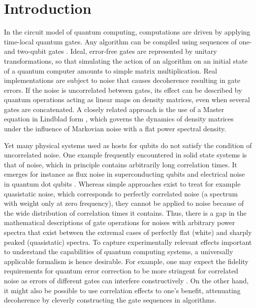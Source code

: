 \section{Introduction}\label{sec:introduction}
In the circuit model of quantum computing, computations are driven by applying time-local quantum gates. Any algorithm can be compiled using sequences of one- and two-qubit gates \cite{DiVincenzo1995}. Ideal, error-free gates are represented by unitary transformations, so that simulating the action of an algorithm on an initial state of a quantum computer amounts to simple matrix multiplication. Real implementations are subject to noise that causes decoherence resulting in gate errors. If the noise is uncorrelated between gates, its effect can be described by quantum operations acting as linear maps on density matrices, even when several gates are concatenated.
A closely related approach is the use of a Master equation in Lindblad form \cite{Lindblad1976}, which governs the dynamics of density matrices under the influence of Markovian noise with a flat power spectral density.

Yet many physical systems used as hosts for qubits do not satisfy the condition of uncorrelated noise. One example frequently encountered in solid state systems is that of \oneoverf noise, which in principle contains arbitrarily long correlation times. It emerges for instance as flux noise in superconducting qubits and electrical noise in quantum dot qubits \cite{Brownnutt2015,Kumar2016,Yoneda2018,Paladino2014}. Whereas simple approaches exist to treat for example quasistatic noise, which corresponds to perfectly correlated noise (\ie a spectrum with weight only at zero frequency), they cannot be applied to \oneoverf noise because of the wide distribution of correlation times it contains. Thus, there is a gap in the mathematical descriptions of gate operations for noises with arbitrary power spectra that exist between the extremal cases of perfectly flat (white) and sharply peaked (quasistatic) spectra. To capture experimentally relevant effects important to understand the capabilities of quantum computing systems, a universally applicable formalism is hence desirable. For example, one may expect the fidelity requirements for quantum error correction to be more stringent for correlated noise as errors of different gates can interfere constructively \cite{Ng2009}. On the other hand, it might also be possible to use correlation effects to one's benefit, attenuating decoherence by cleverly constructing the gate sequences in algorithms.

